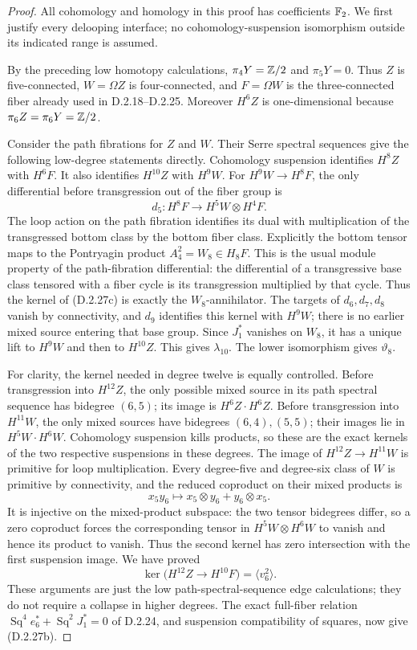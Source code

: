 \begin{proof}
All cohomology and homology in this proof has coefficients
$\mathbb F_2$. We first justify every delooping interface; no
cohomology-suspension isomorphism outside its indicated range
is assumed.

By the preceding low homotopy calculations,
$\pi_4Y=\mathbb Z/2$ and $\pi_5Y=0$. Thus $Z$ is five-connected,
$W=\Omega Z$ is four-connected, and $F=\Omega W$ is the
three-connected fiber already used in \textup{D.2.18--D.2.25}.
Moreover $H^6Z$ is one-dimensional because
$\pi_6Z=\pi_6Y=\mathbb Z/2$.

Consider the path fibrations for $Z$ and $W$.
Their Serre spectral sequences give the following low-degree
statements directly. Cohomology suspension identifies $H^8Z$
with $H^6F$. It also identifies $H^{10}Z$ with $H^9W$.
For $H^9W\to H^8F$, the only differential before transgression
out of the fiber group is
\[
 d_5:H^8F\longrightarrow H^5W\otimes H^4F.
 \tag{D.2.27c}
\]
The loop action on the path fibration identifies its dual
with multiplication of the transgressed bottom class by the
bottom fiber class. Explicitly the bottom tensor maps to
the Pontryagin product $A_4^2=W_8\in H_8F$.
This is the usual module property of the path-fibration
differential: the differential of a transgressive base
class tensored with a fiber cycle is its transgression
multiplied by that cycle.
Thus the kernel of \textup{(D.2.27c)} is exactly the
$W_8$-annihilator. The targets of $d_6,d_7,d_8$ vanish by
connectivity, and $d_9$ identifies this kernel with $H^9W$;
there is no earlier mixed source entering that base group.
Since $J_1^*$ vanishes on $W_8$, it has a unique lift to
$H^9W$ and then to $H^{10}Z$. This gives $\lambda_{10}$.
The lower isomorphism gives $\vartheta_8$.

For clarity, the kernel needed in degree twelve is equally
controlled. Before transgression into $H^{12}Z$, the only
possible mixed source in its path spectral sequence has
bidegree $(6,5)$; its image is $H^6Z\cdot H^6Z$.
Before transgression into $H^{11}W$, the only mixed sources
have bidegrees $(6,4),(5,5)$; their images lie in
$H^5W\cdot H^6W$. Cohomology suspension kills products,
so these are the exact kernels of the two respective
suspensions in these degrees. The image of
$H^{12}Z\to H^{11}W$ is primitive for loop multiplication.
Every degree-five and degree-six class of $W$ is primitive
by connectivity, and the reduced coproduct on their mixed
products is
\[
 x_5y_6\longmapsto x_5\otimes y_6+y_6\otimes x_5.
 \tag{D.2.27d}
\]
It is injective on the mixed-product subspace: the two tensor
bidegrees differ, so a zero coproduct forces the corresponding
tensor in $H^5W\otimes H^6W$ to vanish and hence its product
to vanish. Thus the second kernel has zero intersection with
the first suspension image. We have proved
\[
 \ker\bigl(H^{12}Z\longrightarrow H^{10}F\bigr)
       =\langle v_6^2\rangle.
 \tag{D.2.27e}
\]
These arguments are just the low path-spectral-sequence edge
calculations; they do not require a collapse in higher degrees.
The exact full-fiber relation
$\operatorname{Sq}^4e_6^*+\operatorname{Sq}^2J_1^*=0$
of \textup{D.2.24}, and suspension compatibility of squares,
now give \textup{(D.2.27b)}.


\end{proof}
